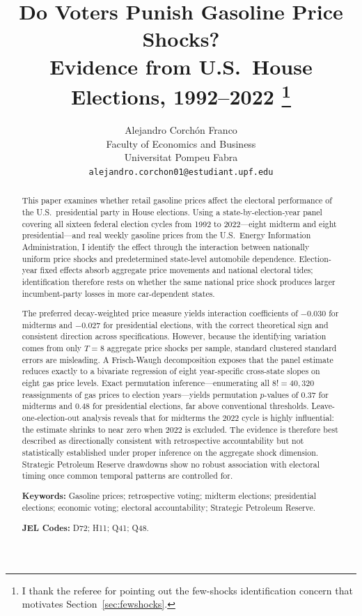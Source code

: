 \documentclass[12pt]{article}
\title{\textbf{Do Voters Punish Gasoline Price Shocks?\\
Evidence from U.S.\ House Elections, 1992--2022}
\thanks{I thank the referee for pointing out the few-shocks identification concern that motivates Section~\ref{sec:fewshocks}.}}
\author{Alejandro Corch\'on Franco\\[4pt]
\small Faculty of Economics and Business\\
\small Universitat Pompeu Fabra\\[2pt]
\small \texttt{alejandro.corchon01@estudiant.upf.edu}}
\date{}
\begin{document}
\maketitle
\thispagestyle{empty}


\begin{abstract}
\noindent
This paper examines whether retail gasoline prices affect the electoral performance of the U.S.\ presidential party in House elections. Using a state-by-election-year panel covering all sixteen federal election cycles from 1992 to 2022---eight midterm and eight presidential---and real weekly gasoline prices from the U.S.\ Energy Information Administration, I identify the effect through the interaction between nationally uniform price shocks and predetermined state-level automobile dependence. Election-year fixed effects absorb aggregate price movements and national electoral tides; identification therefore rests on whether the same national price shock produces larger incumbent-party losses in more car-dependent states.

\noindent
The preferred decay-weighted price measure yields interaction coefficients of $-0.030$ for midterms and $-0.027$ for presidential elections, with the correct theoretical sign and consistent direction across specifications. However, because the identifying variation comes from only $T=8$ aggregate price shocks per sample, standard clustered standard errors are misleading. A Frisch-Waugh decomposition exposes that the panel estimate reduces exactly to a bivariate regression of eight year-specific cross-state slopes on eight gas price levels. Exact permutation inference---enumerating all $8!=40{,}320$ reassignments of gas prices to election years---yields permutation $p$-values of $0.37$ for midterms and $0.48$ for presidential elections, far above conventional thresholds. Leave-one-election-out analysis reveals that for midterms the 2022 cycle is highly influential: the estimate shrinks to near zero when 2022 is excluded. The evidence is therefore best described as directionally consistent with retrospective accountability but not statistically established under proper inference on the aggregate shock dimension. Strategic Petroleum Reserve drawdowns show no robust association with electoral timing once common temporal patterns are controlled for.

\noindent\textbf{Keywords:} Gasoline prices; retrospective voting; midterm elections; presidential elections; economic voting; electoral accountability; Strategic Petroleum Reserve.

\noindent\textbf{JEL Codes:} D72; H11; Q41; Q48.

\end{abstract}
\end{document}
